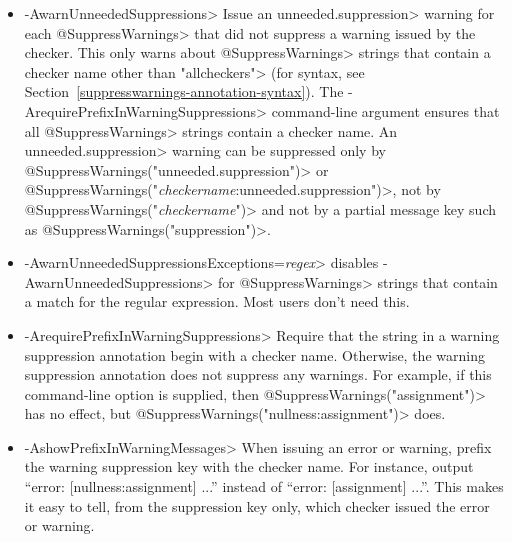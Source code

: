 \begin{itemize}
  With each warning, show all possible strings to suppress that warning.
\item \<-AwarnUnneededSuppressions>
  Issue an \<unneeded.suppression> warning for each \<@SuppressWarnings>
  that did not suppress a warning
  issued by the checker.  This only warns about
  \<@SuppressWarnings> strings that contain a checker name
  other than \<"allcheckers">
  (for syntax, see Section~\ref{suppresswarnings-annotation-syntax}).  The
  \<-ArequirePrefixInWarningSuppressions> command-line argument ensures
  that all \<@SuppressWarnings> strings contain a checker name.
  An \<unneeded.suppression> warning can be suppressed only by
  \<@SuppressWarnings("unneeded.suppression")>
  or \<@SuppressWarnings("\emph{checkername}:unneeded.suppression")>,
  not by \<@SuppressWarnings("\emph{checkername}")> and not by a partial
  message key such as \<@SuppressWarnings("suppression")>.
\item \<-AwarnUnneededSuppressionsExceptions=\emph{regex}> disables
  \<-AwarnUnneededSuppressions> for \<@SuppressWarnings> strings that
  contain a match for the regular expression.  Most users don't need this.
\item \<-ArequirePrefixInWarningSuppressions>
  Require that the string in a warning suppression annotation begin with a checker
  name.  Otherwise, the warning suppression annotation does not
  suppress any warnings.  For example, if this command-line option is
  supplied, then \<@SuppressWarnings("assignment")> has no effect, but
  \<@SuppressWarnings("nullness:assignment")> does.
\item \<-AshowPrefixInWarningMessages>
  When issuing an error or warning, prefix the warning suppression key with
  the checker name.  For instance, output ``error: [nullness:assignment]
  ...'' instead of ``error: [assignment] ...''.  This makes it easy to tell,
  from the suppression key only, which checker issued the error or warning.
\end{itemize}


